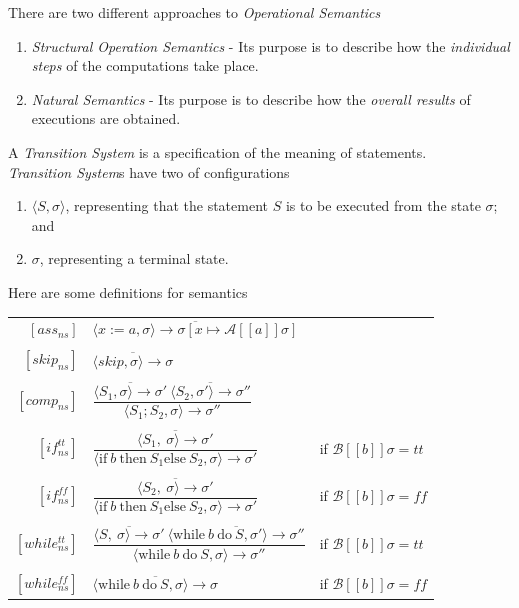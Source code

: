 \documentclass[11pt,a4paper]{article}
\begin{document}
There are two different approaches to \textit{Operational Semantics}
\begin{enumerate}[label=\roman*)]
	\item \textit{Structural Operation Semantics} - Its purpose is to describe how the \textit{individual steps} of the computations take place.
	\item \textit{Natural Semantics} - Its purpose is to describe how the \textit{overall results} of executions are obtained.
\end{enumerate}

A \textit{Transition System} is a specification of the meaning of statements.\\
\textit{Transition System}s have two of configurations
\begin{enumerate}[label=\roman*)]
	\item $\langle S,\sigma\rangle$, representing that the statement $S$ is to be executed from the state $\sigma$; and
	\item $\sigma$, representing a terminal state.
\end{enumerate}

Here are some definitions for semantics\\
\begin{center}
\begin{tabular}{rll}
$[ass_{ns}]$&$\overline{\langle x:= a,\sigma\rangle\to \sigma[x\mapsto\mathcal{A}[[a]]\sigma]}$\\\\
$[skip_{ns}]$&$\overline{\langle skip,\sigma\rangle\to \sigma}$\\\\
$[comp_{ns}]$&$\dfrac{\overline{\langle S_1,\sigma\rangle\to\sigma'}\ \overline{\langle S_2,\sigma'\rangle\to\sigma''}}{\langle S_1; S_2,\sigma\rangle\to\sigma''}$\\\\
$[if_{ns}^{tt}]$&$\dfrac{\overline{\langle S_1,\ \sigma\rangle\to\sigma'}}{\langle\mathrm{if\ }b\mathrm{\ then\ }S_1\mathrm{else\ } S_2,\sigma\rangle\to\sigma'}$&if $\mathcal{B}[[b]]\sigma=tt$\\\\
$[if_{ns}^{ff}]$&$\dfrac{\overline{\langle S_2,\ \sigma\rangle\to\sigma'}}{\langle\mathrm{if\ }b\mathrm{\ then\ }S_1\mathrm{else\ } S_2,\sigma\rangle\to\sigma'}$&if $\mathcal{B}[[b]]\sigma=ff$\\\\
$[while_{ns}^{tt}]$&$\dfrac{\overline{\langle S,\ \sigma\rangle\to\sigma'}\ \overline{\langle\mathrm{while\ }b\mathrm{\ do\ }S,\sigma'\rangle\to\sigma''}}{\langle\mathrm{while\ }b\mathrm{\ do\ } S,\sigma\rangle\to\sigma''}$&if $\mathcal{B}[[b]]\sigma=tt$\\\\
$[while_{ns}^{ff}]$&$\overline{\langle\mathrm{while\ }b\mathrm{\ do\ }S,\sigma\rangle\to\sigma}$&if $\mathcal{B}[[b]]\sigma=ff$
\end{tabular}
\end{center}
\end{document}
